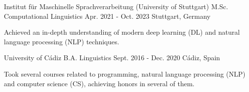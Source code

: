 

\begin{cventries}

  \cventry 
    {Institut für Maschinelle Sprachverarbeitung (University of Stuttgart)} %
    {M.Sc. Computational Linguistics} %
    {Apr. 2021 - Oct. 2023} %
    {Stuttgart, Germany} %
    {
      \begin{cvitems}
        \item {
          Achieved an in-depth understanding of modern deep learning (DL) and natural language processing (NLP) techniques.
        }
      \end{cvitems}
    }
  \cventry
    {University of Cádiz} %
    {B.A. Linguistics} %
    {Sept. 2016 - Dec. 2020} %
    {Cádiz, Spain} %
    {
      \begin{cvitems} %
        \item {Took several courses related to programming, natural language processing (NLP) and computer science (CS), achieving honors in several of them.}
      \end{cvitems}
    }

\end{cventries}
